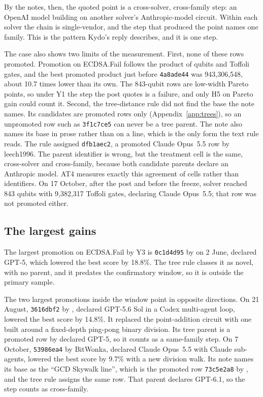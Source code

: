 By the notes, then, the quoted point is a cross-solver, cross-family step: an OpenAI model building on another solver's Anthropic-model circuit.
Within each solver the chain is single-vendor, and the step that produced the point names one family.
This is the pattern Kydo's reply describes, and it is one step.

The case also shows two limits of the measurement.
First, none of these rows promoted.
Promotion on ECDSA.Fail follows the product of qubits and Toffoli gates, and the best promoted product just before \texttt{4a8ade44} was 943,306,548, about 10.7 times lower than its own.
The 843-qubit rows are low-width Pareto points, so under Y1 the step the post quotes is a failure, and only H5 on Pareto gain could count it.
Second, the tree-distance rule did not find the base the note names.
Its candidates are promoted rows only (Appendix~\ref{app:trees}), so an unpromoted row such as \texttt{3f1c7ce5} can never be a tree parent.
The note also names its base in prose rather than on a  line, which is the only form the text rule reads.
The rule assigned \texttt{dfb1aec2}, a promoted Claude Opus~5.5 row by leech1996.
The parent identifier is wrong, but the treatment cell is the same, cross-solver and cross-family, because both candidate parents declare an Anthropic model.
AT4 measures exactly this agreement of cells rather than identifiers.
On 17 October, after the post and before the freeze, solver  reached 843 qubits with 9,382,317 Toffoli gates, declaring Claude Opus~5.5; that row was not promoted either.

\subsection{The largest gains}
\label{sec:casegains}

The largest promotion on ECDSA.Fail by Y3 is \texttt{0c1d4d95} by  on 2 June, declared GPT-5, which lowered the best score by 18.8\%.
The tree rule classes it as novel, with no parent, and it predates the confirmatory window, so it is outside the primary sample.

The two largest promotions inside the window point in opposite directions.
On 21 August, \texttt{3616dbf2} by , declared GPT-5.6 Sol in a Codex multi-agent loop, lowered the best score by 14.8\%.
It replaced the point-addition circuit with one built around a fixed-depth ping-pong binary division.
Its tree parent is a promoted row by  declared GPT-5, so it counts as a same-family step.
On 7 October, \texttt{53986ea4} by BitWonka, declared Claude Opus~5.5 with Claude sub-agents, lowered the best score by 9.7\% with a new division walk.
Its note names its base as the ``GCD Skywalk line'', which is the promoted row \texttt{73c5e2a8} by , and the tree rule assigns the same row.
That parent declares GPT-6.1, so the step counts as cross-family.

